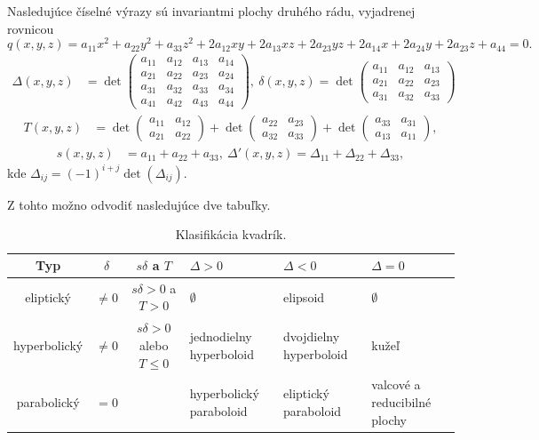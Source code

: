 Nasledujúce číselné výrazy sú invariantmi plochy druhého rádu, vyjadrenej rovnicou 
\[ q(x, y, z) = a_{11}x^2 + a_{22}y^2 + a_{33}z^2 + 2a_{12}xy + 2a_{13}xz + 2a_{23}yz + 2a_{14}x + 2a_{24}y + 2a_{23}z + a_{44} = 0. \]
\begin{align*}
\Delta(x, y, z) &= \det \begin{pmatrix} 
a_{11} & a_{12} & a_{13} & a_{14} \\ 
a_{21} & a_{22} & a_{23} & a_{24} \\
a_{31} & a_{32} & a_{33} & a_{34} \\
a_{41} & a_{42} & a_{43} & a_{44}
\end{pmatrix}, \
\delta(x, y, z) = \det \begin{pmatrix} 
a_{11} & a_{12} & a_{13} \\ 
a_{21} & a_{22} & a_{23} \\ 
a_{31} & a_{32} & a_{33} 
\end{pmatrix}
\end{align*}
\begin{align*}
T(x, y, z) &= \det \begin{pmatrix} 
a_{11} & a_{12} \\ 
a_{21} & a_{22} 
\end{pmatrix} + \det \begin{pmatrix} 
a_{22} & a_{23} \\ 
a_{32} & a_{33} 
\end{pmatrix} + \det \begin{pmatrix} 
a_{33} & a_{31} \\ 
a_{13} & a_{11} 
\end{pmatrix}, 
\end{align*}
\begin{align*}
s(x, y, z) &= a_{11} + a_{22} + a_{33}, \ \Delta'(x, y, z) = \Delta_{11} + \Delta_{22} + \Delta_{33}, 
\end{align*}
kde $
\Delta_{ij} = (-1)^{i+j} \det(\Delta_{ij}).$

Z tohto možno odvodiť nasledujúce dve tabuľky.

\begin{table}[h]
\centering
\begin{tabular}{|c|c|c|p{2.2cm}|p{2.15cm}|p{2cm}|}
\hline
Typ & $\delta$ & $s\delta$ a $T$ & $\Delta > 0$ & $\Delta < 0$ & $\Delta = 0$ \\
\hline
eliptický & $\neq 0$ & $s\delta>0$ a $T>0$ & $\emptyset$ & elipsoid & $\emptyset$ \\
\hline
hyperbolický & $\neq 0$ & $s\delta>0$ alebo $T \leq0$ & jednodielny hyperboloid & dvojdielny hyperboloid & kužeľ \\
\hline
parabolický & $=0$ & & hyperbolický paraboloid & eliptický paraboloid & valcové a reducibilné plochy \\
\hline
\end{tabular}
\caption{Klasifikácia kvadrík.}
\label{tab:classification_of_quadrics}
\end{table}

